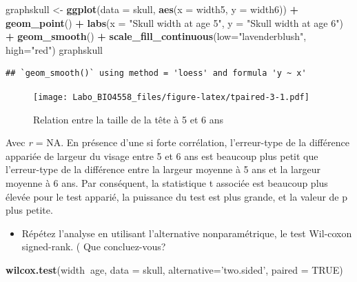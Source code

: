 \documentclass[12pt,]{book}
\newenvironment{Shaded}{\begin{snugshade}}{\end{snugshade}}
\newcommand{\DataTypeTok}[1]{\textcolor[rgb]{0.27,0.27,0.27}{#1}}
\newcommand{\KeywordTok}[1]{\textcolor[rgb]{0.27,0.27,0.27}{\textbf{#1}}}
\newcommand{\NormalTok}[1]{#1}
\newcommand{\OperatorTok}[1]{\textcolor[rgb]{0.43,0.43,0.43}{\textbf{#1}}}
\newcommand{\OtherTok}[1]{\textcolor[rgb]{0.37,0.37,0.37}{#1}}
\newcommand{\StringTok}[1]{\textcolor[rgb]{0.5,0.5,0.5}{#1}}
\providecommand{\tightlist}{%
  \setlength{\itemsep}{0pt}\setlength{\parskip}{0pt}}
\begin{document}
\begin{Shaded}
\begin{Highlighting}[]
\NormalTok{graphskull <-}\StringTok{ }\KeywordTok{ggplot}\NormalTok{(}\DataTypeTok{data =}\NormalTok{ skull, }\KeywordTok{aes}\NormalTok{(}\DataTypeTok{x =}\NormalTok{ width5, }\DataTypeTok{y =}\NormalTok{ width6)) }\OperatorTok{+}
\StringTok{  }\KeywordTok{geom_point}\NormalTok{() }\OperatorTok{+}
\StringTok{  }\KeywordTok{labs}\NormalTok{(}\DataTypeTok{x =} \StringTok{"Skull width at age 5"}\NormalTok{, }\DataTypeTok{y =} \StringTok{"Skull width at age 6"}\NormalTok{) }\OperatorTok{+}
\StringTok{  }\KeywordTok{geom_smooth}\NormalTok{() }\OperatorTok{+}
\StringTok{  }\KeywordTok{scale_fill_continuous}\NormalTok{(}\DataTypeTok{low=}\StringTok{"lavenderblush"}\NormalTok{, }\DataTypeTok{high=}\StringTok{"red"}\NormalTok{)}
\NormalTok{graphskull}
\end{Highlighting}
\end{Shaded}

\begin{verbatim}
## `geom_smooth()` using method = 'loess' and formula 'y ~ x'
\end{verbatim}

\begin{figure}
\centering
\texttt{[image: Labo\_BIO4558\_files/figure-latex/tpaired-3-1.pdf]}
\caption{\label{fig:tpaired-3}Relation entre la taille de la tête à 5 et 6 ans}
\end{figure}

Avec \emph{r} = NA. En présence d'une si forte corrélation, l'erreur-type de la différence appariée de largeur du visage entre 5 et 6 ans est beaucoup plus petit que l'erreur-type de la différence entre la largeur moyenne à 5 ans et la largeur moyenne à 6 ans. Par conséquent, la statistique t associée est beaucoup plus élevée pour le test apparié, la puissance du test est plus grande, et la valeur de p plus petite.

\begin{itemize}
\tightlist
\item
  Répétez l'analyse en utilisant l'alternative nonparamétrique, le test Wil-coxon signed-rank. ( Que concluez-vous?
\end{itemize}

\begin{Shaded}
\begin{Highlighting}[]
\KeywordTok{wilcox.test}\NormalTok{(width}\OperatorTok{~}\NormalTok{age, }\DataTypeTok{data =}\NormalTok{ skull,}
  \DataTypeTok{alternative=}\StringTok{'two.sided'}\NormalTok{,}
  \DataTypeTok{paired =} \OtherTok{TRUE}\NormalTok{)}
\end{Highlighting}
\end{Shaded}
\end{document}
